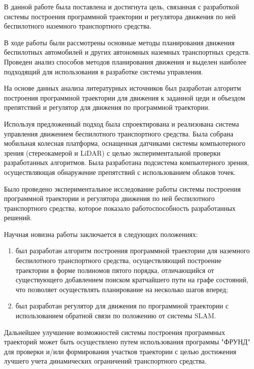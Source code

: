 
В данной работе была поставлена и достигнута цель, связанная с разработкой системы построения программной траектории
и регулятора движения по ней беспилотного наземного транспортного средства.

В ходе работы были рассмотрены основные методы планирования движения беспилотных автомобилей и других автономных
наземных транспортных средств. Проведен анализ способов методов планирования движения и выделен наиболее подходящий
для использования в разработке системы управления.

На основе данных анализа литературных источников был разработан алгоритм построения программной траектории для
движения к заданной цеди и объездом препятствий и регулятор для движения по программной траектории.

Используя предложенный подход была спроектирована и реализована система управления движением беспилотного транспортного
средства. Была собрана мобильная колесная платформа, оснащенная датчиками  системы компьютерного зрения
(стереокамерой и LiDAR) с целью экспериментальной проверки разработанных алгоритмов. Была разработана подсистема
компьютерного зрения, осуществляющая обнаружение препятствий с использованием облаков точек.

Было проведено экспериментальное исследование работы системы построения программной траектории и регулятора движения
по ней беспилотного транспортного средства, которое показало работоспособность разработанных решений.

Научная новизна работы заключается в следующих положениях:
\begin{enumerate}
    \item был разработан алгоритм построения программной траектории для наземного беспилотного транспортного
          средства, осуществляющий построение траектории в форме полиномов пятого порядка, отличающийся от существующего
          добавлением поиском кратчайшего пути на графе состояний, что позволяет осуществлять планирование на несколько
          шагов вперед;
    \item был разработан регулятор для движения по программной траектории с использованием обратной связи по положению
          от системы SLAM.
\end{enumerate}

Дальнейшее улучшение возможностей системы построения программных траекторий может быть осуществлено путем использования
программы "ФРУНД" для проверки и/или формирования участков траектории с целью достижения лучшего учета динамических
ограничений транспортного средства.